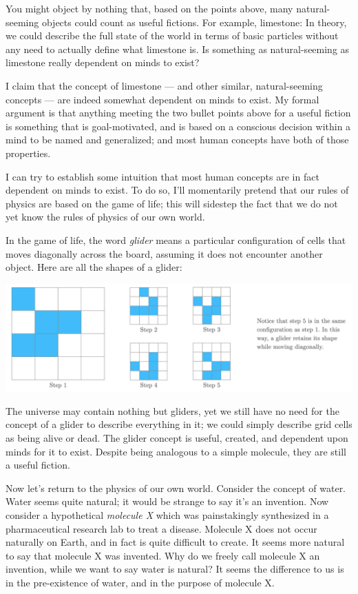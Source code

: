 \documentclass[11pt, oneside]{article}   	%
\begin{document}
You might object by nothing that, based on the points above,
many natural-seeming objects could count as useful fictions.
For example, limestone: In theory, we could describe the full state of the world
in terms of basic particles without any need to actually
define what limestone is. Is something as natural-seeming as limestone really
dependent on minds to exist?

I claim that the concept of limestone --- and other similar, natural-seeming
concepts --- are indeed somewhat dependent on minds to exist.
My formal argument is that anything meeting the two bullet points above for a
useful fiction is something that is goal-motivated, and is based on a conscious
decision within a mind to be named and generalized; and most human concepts have
both of those properties.

I can try to establish some intuition that most human concepts are in fact
dependent on minds to exist. To do so, I'll momentarily pretend that our rules
of physics are based on the game of life; this will sidestep the fact that we do
not yet know the rules of physics of our own world.

In the game of life, the word {\em glider} means a particular 
configuration of cells that moves diagonally across the board, assuming it does
not encounter another object.
% 
% 
Here are all the shapes of a glider:
\begin{center}
\includegraphics[width=14cm]{glider2.png}
\end{center}
The universe may contain nothing but gliders, yet we still have no need
for the concept of a glider to describe everything in it; we could simply
describe grid cells as being alive or dead.
The glider concept is useful, created, and dependent upon minds for it to
exist. Despite being analogous to a simple molecule, they are still a useful
fiction.

Now let's return to the physics of our own world. Consider the concept of water.
Water seems quite natural;
it would be strange to say it's an invention.
Now consider a hypothetical {\em molecule X} which was painstakingly synthesized
in a pharmaceutical research lab to treat a disease.
Molecule X does not occur naturally on Earth,
and in fact is quite difficult to create. It seems more natural to say that
molecule X was invented.
Why do we freely call molecule X an invention, while we want to say
water is natural?
It seems the difference to us is in the pre-existence of water, and
in the purpose of molecule X.
\end{document}
